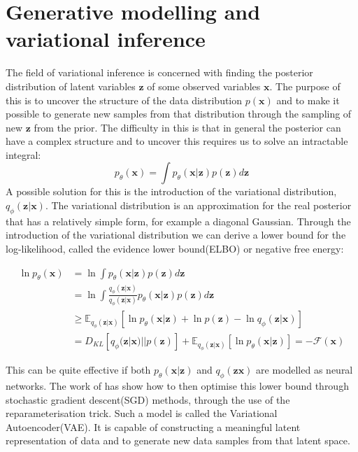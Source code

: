 \documentclass{report}
\newcommand{\E}{\mathbb{E}}
\newcommand{\bx}{\mathbf{x}}
\newcommand{\bz}{\mathbf{z}}
\begin{document}
\chapter{Generative modelling and variational inference}
The field of variational inference is concerned with finding the posterior distribution of latent variables $\bz$ of some observed variables $\bx$. The purpose of this is to uncover the structure of the data distribution $p(\bx)$ and to make it possible to generate new samples from that distribution through the sampling of new $\bz$ from the prior\footnotemark[\ref{note:citation}]. The difficulty in this is that in general the posterior can have a complex structure and to uncover this requires us to solve an intractable integral:
\begin{equation}
    p_\theta(\bx) = \int p_\theta(\bx|\bz)p(\bz) d\bz
\end{equation}
A possible solution for this is the introduction of the variational distribution, $q_\phi(\bz|\bx)$\footnotemark[\ref{note:citation}]. The variational distribution is an approximation for the real posterior that has a relatively simple form, for example a diagonal Gaussian. Through the introduction of the variational distribution we can derive a lower bound for the log-likelihood, called the evidence lower bound(ELBO) or negative free energy\footnotemark[\ref{note:citation}]:

\begin{equation}\label{equation:negative_free_energy}
    \begin{split}
    \ln p_\theta(\bx) &= \ln \int p_\theta(\bx|\bz)p(\bz) d\bz\\
    &= \ln \int \frac{q_\phi(\bz|\bx)}{q_\phi(\bz|\bx)} p_\theta(\bx|\bz)p(\bz)d\bz\\
    &\geq \E_{q_\phi(\bz|\bx)}[\ln p_\theta(\bx|\bz) + \ln p(\bz) - \ln q_\phi(\bz|\bx)] \\
    &= D_{KL}[q_\phi(\bz|\bx) || p(\bz)] + \E_{q_\phi(\bz|\bx)}[\ln p_\theta(\bx|\bz)]= -\mathcal{F}(\bx)
    \end{split}
\end{equation}

This can be quite effective if both $p_\theta(\bx|\bz)$ and $q_\phi(\bz\bx)$ are modelled as neural networks. The work of \cite{kingma2013auto} has show how to then optimise this lower bound through stochastic gradient descent(SGD) methods, through the use of the reparameterisation trick. Such a model is called the Variational Autoencoder(VAE). It is capable of constructing a meaningful latent representation of data and to generate new data samples from that latent space. 
\end{document}

